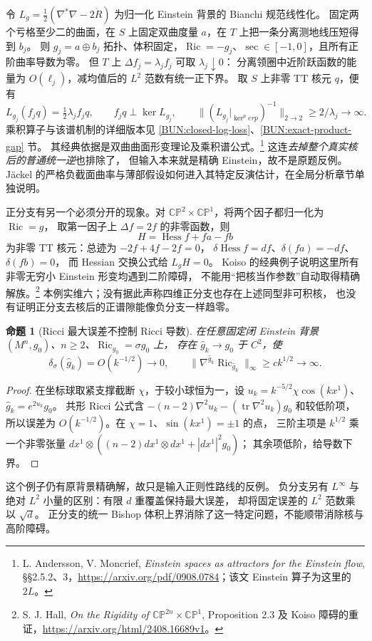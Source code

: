 \documentclass[UTF8,fontset=fandol,zihao=-4,oneside,openany]{ctexbook}
\theoremstyle{cjkplain}
\newtheorem{proposition}[theorem]{命题}
\numberwithin{equation}{chapter}
\DeclareMathOperator{\Ric}{Ric}
\begin{document}
令 \(L_g=\tfrac12(\nabla^*\nabla-2\mathring R)\) 为归一化 Einstein 背景的 Bianchi 规范线性化。
固定两个亏格至少二的曲面，在 \(S\) 上固定双曲度量 \(a\)，在 \(T\) 上把一条分离测地线压短得到 \(b_j\)。
则 \(g_j=a\oplus b_j\) 拓扑、体积固定，\(\Ric=-g_j\)、\(\sec\in[-1,0]\)，且所有正阶曲率导数为零。
但 \(T\) 上 \(\Delta f_j=\lambda_jf_j\) 可取 \(\lambda_j\downarrow0\)：
分离领圈中近阶跃函数的能量为 \(O(\ell_j)\)，减均值后的 \(L^2\) 范数有统一正下界。
取 \(S\) 上非零 TT 核元 \(q\)，便有
\[
L_{g_j}(f_jq)=\tfrac12\lambda_jf_jq,\qquad
f_jq\perp\ker L_{g_j},\qquad
\|(L_{g_j}|_{\ker^perp})^{-1}\|_{2\to2}\ge2/\lambda_j\to\infty.
\]
乘积算子与该谱机制的详细版本见 \ref{BUN:closed-log-loss}、\ref{BUN:exact-product-gap} 节。
其经典依据是双曲曲面形变理论及乘积谱公式。\footnote{L. Andersson, V. Moncrief, \emph{Einstein spaces as attractors for the Einstein flow}, \S\S2.5.2、3，\url{https://arxiv.org/pdf/0908.0784}；该文 Einstein 算子为这里的 \(2L\)。}
这连\emph{去掉整个真实核后的普通统一逆}也排除了，
但输入本来就是精确 Einstein，故不是原题反例。
Jäckel 的严格负截面曲率与薄部假设如何进入其特定反演估计，在全局分析章节单独说明。

正分支有另一个必须分开的现象。对
\(\mathbb{CP}^2\times\mathbb{CP}^1\)，将两个因子都归一化为 \(\Ric=g\)，
取第一因子上 \(\Delta f=2f\) 的非零函数，则
\[
H=\operatorname{Hess}f+fa-fb
\]
为非零 TT 核元：总迹为 \(-2f+4f-2f=0\)，
\(\delta\operatorname{Hess}f=df\)、\(\delta(fa)=-df\)、\(\delta(fb)=0\)，
而 Hessian 交换公式给 \(L_gH=0\)。
Koiso 的经典例子说明这里所有非零无穷小 Einstein 形变均遇到二阶障碍，
不能用“把核当作参数”自动取得精确解族。\footnote{S. J. Hall, \emph{On the Rigidity of \(\mathbb{CP}^{2n}\times\mathbb{CP}^1\)}, Proposition 2.3 及 Koiso 障碍的重证，\url{https://arxiv.org/html/2408.16689v1}。}
本例实维六；没有据此声称四维正分支也存在上述同型非可积核，
也没有证明正分支去核后的正谱隙能像负分支一样趋零。

\begin{proposition}[Ricci 最大误差不控制 Ricci 导数]
在任意固定闭 Einstein 背景 \((M^n,g_0)\)、\(n\ge2\)、\(\Ric_{g_0}=\sigma g_0\) 上，
存在 \(\widehat g_k\to g_0\) 于 \(C^2\)，使
\[
\delta_\sigma(\widehat g_k)=O(k^{-1/2})\to0,
\qquad\|\nabla^{\widehat g_k}\Ric_{\widehat g_k}\|_\infty\ge c k^{1/2}\to\infty.
\]
\end{proposition}
\begin{proof}
在坐标球取紧支撑截断 \(\chi\)，于较小球恒为一，设
\(u_k=k^{-5/2}\chi\cos(kx^1)\)、\(\widehat g_k=e^{2u_k}g_0\)。
共形 Ricci 公式含 \(-(n-2)\nabla^2u_k-(\operatorname{tr}\nabla^2u_k)g_0\) 和较低阶项，
所以误差为 \(O(k^{-1/2})\)。在 \(\chi=1\)、\(\sin(kx^1)=\pm1\) 的点，
三阶主项是 \(k^{1/2}\) 乘一个非零张量
\(dx^1\otimes((n-2)dx^1\otimes dx^1+|dx^1|^2g_0)\)；
其余项低阶，给导数下界。
\end{proof}
这个例子仍有原背景精确解，故只是输入正则性路线的反例。
负分支另有 \(L^\infty\) 与绝对 \(L^2\) 小量的区别：有限 \(d\) 重覆盖保持最大误差，
却将固定误差的 \(L^2\) 范数乘以 \(\sqrt d\)。
正分支的统一 Bishop 体积上界消除了这一特定问题，不能顺带消除核与高阶障碍。
\end{document}

